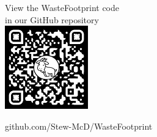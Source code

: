 \documentclass[a0paper,fleqn]{betterposter}
\begin{document}
{\begin{center}
    \vspace{15pt}
    {\fontsize{36}{40}\selectfont View the WasteFootprint code\\ in our GitHub repository\\}
    \vspace{10pt}
    \includegraphics[width=0.27\textwidth]{img/qr-code.pdf}
    \vspace{10pt}

    {\fontsize{16}{10}\selectfont github.com/Stew-McD/WasteFootprint\\}
    \end{center}
}
\end{document}
